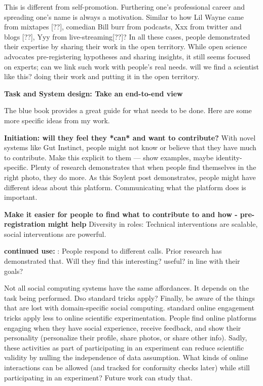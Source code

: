 This is different from self-promotion. Furthering one’s professional career and spreading one’s name is always a motivation. Similar to how Lil Wayne came from mixtapes [??], comedian Bill burr from podcasts, Xxx from twitter and blogs [??], Yyy from live-streaming[??]? In all these cases, people demonstrated their expertise by sharing their work in the open territory. While open science advocates pre-registering hypotheses and sharing insights, it still seems focused on experts; can we link such work with people’s real needs. will we find a scientist like this? doing their work and putting it in the open territory.

\textbf{Task and System design: Take an end-to-end view}

The blue book provides a great guide for what needs to be done. Here are some more specific ideas from my work.

\textbf{Initiation: will they feel they *can* and want to contribute?} With novel systems like Gut Instinct, people might not know or believe that they have much to contribute. Make this explicit to them — show examples, maybe identity-specific. Plenty of research demonstrates that when people find themselves in the right photo, they do more. As this Soylent post demonstrates, people might have different ideas about this platform. Communicating what the platform does is important.

\textbf{Make it easier for people to find what to contribute to and how - pre-registration might help} Diversity in roles: Technical interventions are scalable, social interventions are powerful. 

\textbf{continued use: }:  People respond to different calls. Prior research has demonstrated that. Will they find this interesting? useful? in line with their goals?

Not all social computing systems have the same affordances. It depends on the task being performed. Dso standard tricks apply? Finally, be aware of the things that are lost with domain-specific social computing. standard online engagement tricks apply less to online scientific experimentation. People find online platforms engaging when they have social experience, receive feedback, and show their personality (personalize their profile, share photos, or share other info). Sadly, these activities as part of participating in an experiment can reduce scientific validity by nulling the independence of data assumption. What kinds of online interactions can be allowed (and tracked for conformity checks later) while still participating in an experiment? Future work can study that.

